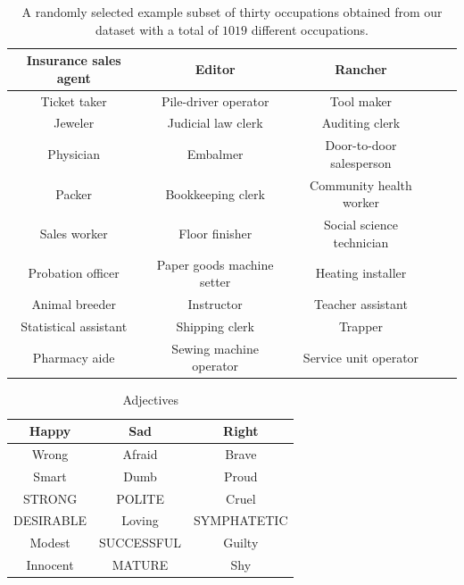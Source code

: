 \documentclass[fleqn,10pt]{article}
\begin{document}
\begin{table}[H]
\centering
\small{
	\begin{tabular}{|c|c|c|c|c|}
	\hline
	Insurance sales agent 	& Editor 						& Rancher 					\\ \hline
	Ticket taker 			& Pile-driver operator 			& Tool maker 				\\ \hline
	Jeweler 				& Judicial law clerk 			& Auditing clerk 			\\ \hline
	Physician 				& Embalmer 						& Door-to-door salesperson 	\\ \hline
	Packer 					& Bookkeeping clerk 			& Community health worker 	\\ \hline
	Sales worker 			& Floor finisher 				& Social science technician \\ \hline
	Probation officer 		& Paper goods machine setter 	& Heating installer 		\\ \hline
	Animal breeder 			& Instructor 					& Teacher assistant 		\\ \hline
	Statistical assistant 	& Shipping clerk 				& Trapper 					\\ \hline
	Pharmacy aide 			& Sewing machine operator 		& Service unit operator 	\\ \hline
	\end{tabular}
	}
    \caption{A randomly selected example subset of thirty occupations obtained from our dataset with a total of $1019$ different occupations.}
	\label{tab:occupations-examples}
\end{table}

\begin{table}[H]
\centering
\small{
	\begin{tabular}{|c|c|c|}
	\hline
	Happy 		& Sad 		 & Right 	\\ \hline
	Wrong 		& Afraid	 & Brave 	\\ \hline
	Smart		& Dumb		 & Proud 	\\ \hline
	STRONG		& POLITE	 & Cruel 	\\ \hline
	DESIRABLE	& Loving	 & SYMPHATETIC 	\\ \hline
	Modest 		& SUCCESSFUL & Guilty	\\ \hline
	Innocent	& MATURE	 & Shy		\\ \hline
	\end{tabular}
	}
    \caption{Adjectives}
	\label{tab:adjectives}
\end{table}
\end{document}
